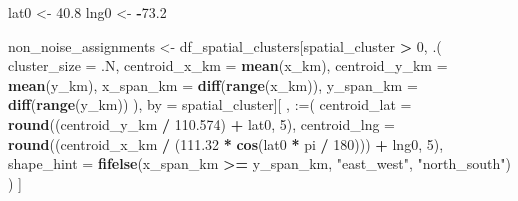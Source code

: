 \documentclass[
]{article}
\newenvironment{Shaded}{\begin{snugshade}}{\end{snugshade}}
\newcommand{\AttributeTok}[1]{\textcolor[rgb]{0.13,0.29,0.53}{#1}}
\newcommand{\DecValTok}[1]{\textcolor[rgb]{0.00,0.00,0.81}{#1}}
\newcommand{\FloatTok}[1]{\textcolor[rgb]{0.00,0.00,0.81}{#1}}
\newcommand{\FunctionTok}[1]{\textcolor[rgb]{0.13,0.29,0.53}{\textbf{#1}}}
\newcommand{\NormalTok}[1]{#1}
\newcommand{\OtherTok}[1]{\textcolor[rgb]{0.56,0.35,0.01}{#1}}
\newcommand{\SpecialCharTok}[1]{\textcolor[rgb]{0.81,0.36,0.00}{\textbf{#1}}}
\newcommand{\StringTok}[1]{\textcolor[rgb]{0.31,0.60,0.02}{#1}}
\begin{document}
\begin{Shaded}
\begin{Highlighting}[]
\NormalTok{lat0 }\OtherTok{\textless{}{-}} \FloatTok{40.8}
\NormalTok{lng0 }\OtherTok{\textless{}{-}} \SpecialCharTok{{-}}\FloatTok{73.2}

\NormalTok{non\_noise\_assignments }\OtherTok{\textless{}{-}}\NormalTok{ df\_spatial\_clusters[spatial\_cluster }\SpecialCharTok{\textgreater{}} \DecValTok{0}\NormalTok{, .(}
  \AttributeTok{cluster\_size =}\NormalTok{ .N,}
  \AttributeTok{centroid\_x\_km =} \FunctionTok{mean}\NormalTok{(x\_km),}
  \AttributeTok{centroid\_y\_km =} \FunctionTok{mean}\NormalTok{(y\_km),}
  \AttributeTok{x\_span\_km =} \FunctionTok{diff}\NormalTok{(}\FunctionTok{range}\NormalTok{(x\_km)),}
  \AttributeTok{y\_span\_km =} \FunctionTok{diff}\NormalTok{(}\FunctionTok{range}\NormalTok{(y\_km))}
\NormalTok{), by }\OtherTok{=}\NormalTok{ spatial\_cluster][}
\NormalTok{  , }\StringTok{\textasciigrave{}}\AttributeTok{:=}\StringTok{\textasciigrave{}}\NormalTok{(}
    \AttributeTok{centroid\_lat =} \FunctionTok{round}\NormalTok{((centroid\_y\_km }\SpecialCharTok{/} \FloatTok{110.574}\NormalTok{) }\SpecialCharTok{+}\NormalTok{ lat0, }\DecValTok{5}\NormalTok{),}
    \AttributeTok{centroid\_lng =} \FunctionTok{round}\NormalTok{((centroid\_x\_km }\SpecialCharTok{/}\NormalTok{ (}\FloatTok{111.32} \SpecialCharTok{*} \FunctionTok{cos}\NormalTok{(lat0 }\SpecialCharTok{*}\NormalTok{ pi }\SpecialCharTok{/} \DecValTok{180}\NormalTok{))) }\SpecialCharTok{+}\NormalTok{ lng0, }\DecValTok{5}\NormalTok{),}
    \AttributeTok{shape\_hint =} \FunctionTok{fifelse}\NormalTok{(x\_span\_km }\SpecialCharTok{\textgreater{}=}\NormalTok{ y\_span\_km, }\StringTok{"east\_west"}\NormalTok{, }\StringTok{"north\_south"}\NormalTok{)}
\NormalTok{  )}
\NormalTok{]}


\end{Highlighting}
\end{Shaded}
\end{document}

